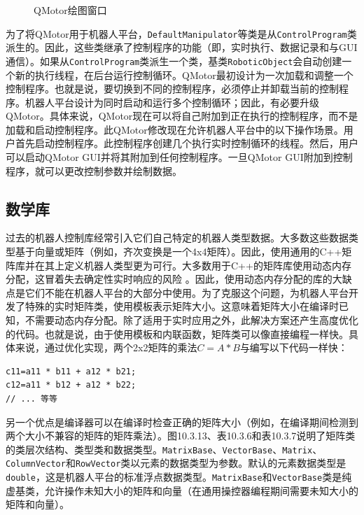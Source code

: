 \documentclass[UTF8,a4paper,12pt]{ctexart}
\begin{document}
\begin{figure}[htbp]
\centering
{}
\caption{QMotor绘图窗口}
\label{fig:10.3.12}
\end{figure}

为了将QMotor用于机器人平台，\texttt{DefaultManipulator}等类是从\texttt{ControlProgram}类派生的。因此，这些类继承了控制程序的功能（即，实时执行、数据记录和与GUI通信）。如果从\texttt{ControlProgram}类派生一个类，基类\texttt{RoboticObject}会自动创建一个新的执行线程，在后台运行控制循环。QMotor最初设计为一次加载和调整一个控制程序。也就是说，要切换到不同的控制程序，必须停止并卸载当前的控制程序。机器人平台设计为同时启动和运行多个控制循环；因此，有必要升级QMotor。具体来说，QMotor现在可以将自己附加到正在执行的控制程序，而不是加载和启动控制程序。此QMotor修改现在允许机器人平台中的以下操作场景。用户首先启动控制程序。此控制程序创建几个执行实时控制循环的线程。然后，用户可以启动QMotor GUI并将其附加到任何控制程序。一旦QMotor GUI附加到控制程序，就可以更改控制参数并绘制数据。

\subsection{数学库}

过去的机器人控制库经常引入它们自己特定的机器人类型数据。大多数这些数据类型基于向量或矩阵（例如，齐次变换是一个4x4矩阵）。因此，使用通用的C++矩阵库并在其上定义机器人类型更为可行。大多数用于C++的矩阵库使用动态内存分配，这冒着失去确定性实时响应的风险 \cite{Loffler2001}。因此，使用动态内存分配的库的大缺点是它们不能在机器人平台的大部分中使用。为了克服这个问题，为机器人平台开发了特殊的实时矩阵类，使用模板表示矩阵大小。这意味着矩阵大小在编译时已知，不需要动态内存分配。除了适用于实时应用之外，此解决方案还产生高度优化的代码。也就是说，由于使用模板和内联函数，矩阵类可以像直接编程一样快。具体来说，通过优化实现，两个2x2矩阵的乘法$C=A * B$与编写以下代码一样快：

\begin{lstlisting}[caption={矩阵乘法优化示例}]
c11=a11 * b11 + a12 * b21;
c12=a11 * b12 + a12 * b22;
// ... 等等
\end{lstlisting}

另一个优点是编译器可以在编译时检查正确的矩阵大小（例如，在编译期间检测到两个大小不兼容的矩阵的矩阵乘法）。图10.3.13、表10.3.6和表10.3.7说明了矩阵类的类层次结构、类型类和数据类型。\texttt{MatrixBase}、\texttt{VectorBase}、\texttt{Matrix}、\texttt{ColumnVector}和\texttt{RowVector}类以元素的数据类型为参数。默认的元素数据类型是\texttt{double}，这是机器人平台的标准浮点数据类型。\texttt{MatrixBase}和\texttt{VectorBase}类是纯虚基类，允许操作未知大小的矩阵和向量（在通用操控器编程期间需要未知大小的矩阵和向量）。
\end{document}
